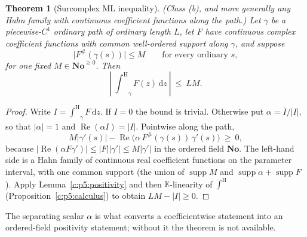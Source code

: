 \documentclass[11pt,a4paper]{article}
\numberwithin{equation}{section}
\newtheorem{theorem}{Theorem}[section]
\theoremstyle{definition}
\theoremstyle{remark}
\theoremstyle{plain}
\newcommand{\K}{\mathbb K}
\newcommand{\No}{\mathbf{No}}
\DeclareMathOperator{\supp}{supp}
\newcommand{\ev}[1]{#1^{\#}}
\newcommand{\intH}{{\int^{\mathrm H}}}
\newcommand{\abs}[1]{\lvert #1\rvert}
\newcommand{\dd}{\mathrm d}
\begin{document}
\begin{theorem}[Surcomplex ML inequality]\label{c:p5:ML}
\emph{(Class (b), and more generally any Hahn family with continuous
coefficient functions along the path.)} Let $\gamma$ be a
piecewise-$C^{1}$ ordinary path of ordinary length $L$, let $F$ have
continuous complex coefficient functions with common well-ordered
support along $\gamma$, and suppose
\[
 \abs{\ev F(\gamma(s))}\le M\qquad\text{for every ordinary }s,
\]
for one fixed $M\in\No^{\ge0}$. Then
\begin{equation}\label{c:p5:eq-ML}
 \left|\ \intH_{\gamma}F(z)\,\dd z\ \right|\ \le\ LM .
\end{equation}
\end{theorem}

\begin{proof}
Write $I=\intH_\gamma F\,\dd z$. If $I=0$ the bound is trivial.
Otherwise put $\alpha=\overline I/\abs I$, so that $\abs\alpha=1$ and
$\operatorname{Re}(\alpha I)=\abs I$. Pointwise along the path,
\[
 M\abs{\gamma'(s)}-\operatorname{Re}
   \bigl(\alpha\,\ev F(\gamma(s))\,\gamma'(s)\bigr)\ \ge\ 0,
\]
because $\abs{\operatorname{Re}(\alpha F\gamma')}\le
\abs{F}\abs{\gamma'}\le M\abs{\gamma'}$ in the ordered field $\No$.
The left-hand side is a Hahn family of continuous real coefficient
functions on the parameter interval, with one common support (the
union of $\supp M$ and $\supp\alpha+\supp F$). Apply
Lemma~\ref{c:p5:positivity} and then $\K$-linearity of $\intH$
(Proposition~\ref{c:p5:calculus}) to obtain $LM-\abs I\ge0$.
\end{proof}

The separating scalar $\alpha$ is what converts a coefficientwise
statement into an ordered-field positivity statement; without it the
theorem is not available.
\end{document}
